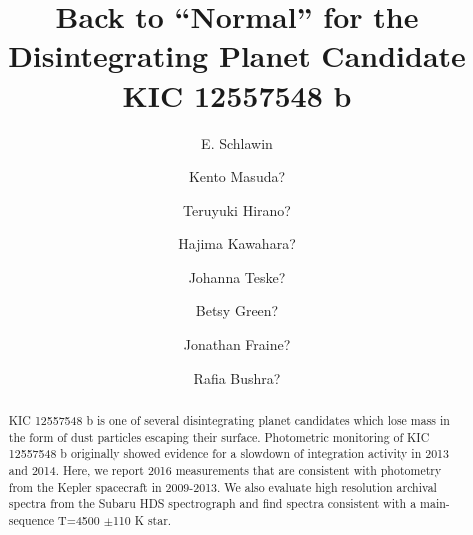 \documentclass[preprint]{aastex61}
\begin{document}
\title{Back to ``Normal'' for the Disintegrating Planet Candidate KIC 12557548 b}



\author{E. Schlawin}

\author{Kento Masuda?}

\author{Teruyuki Hirano?}

\author{Hajima Kawahara?}

\author{Johanna Teske?}

\author{Betsy Green?}

\author{Jonathan Fraine?}

\author{Rafia Bushra?}

\begin{abstract}
KIC 12557548 b is one of several disintegrating planet candidates which lose mass in the form of dust particles escaping their surface.
Photometric monitoring of KIC 12557548 b originally showed evidence for a slowdown of integration activity in 2013 and 2014.
Here, we report 2016 measurements that are consistent with photometry from the Kepler spacecraft in 2009-2013.
We also evaluate high resolution archival spectra from the Subaru HDS spectrograph and find spectra consistent with a main-sequence T=4500 $\pm$110 K star.
\end{abstract}


\end{document}
